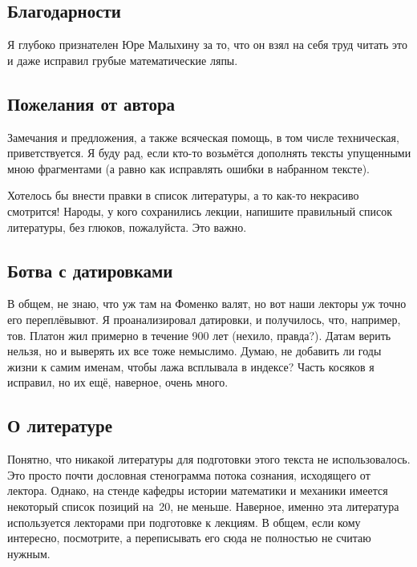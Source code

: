 \documentclass[a4paper,oneside,fleqn,10pt]{article}
\begin{document}
\subsection*{Благодарности}

Я глубоко признателен Юре Малыхину за то, что он взял на себя труд читать это
и даже исправил грубые математические ляпы.

\subsection*{Пожелания от автора}

Замечания и предложения, а также всяческая помощь, в том числе техническая, приветствуется.
Я буду рад, если кто-то возьмётся дополнять тексты упущенными
мною фрагментами (а равно как исправлять ошибки в набранном тексте).

Хотелось бы внести правки в список литературы, а то как-то некрасиво смотрится!
Народы, у кого сохранились лекции, напишите правильный список литературы,
без глюков, пожалуйста. Это важно.

\subsection*{Ботва с датировками}

В общем, не знаю, что уж там на Фоменко валят,
но вот наши лекторы уж точно его переплёвывют.
Я проанализировал датировки, и получилось, что,
например, тов. Платон жил примерно в течение 900 лет (нехило, правда?).
Датам верить нельзя, но и выверять их все тоже немыслимо. Думаю, не добавить ли годы жизни к
самим именам, чтобы лажа всплывала в индексе?
Часть косяков я исправил, но их ещё, наверное, очень много.

\subsection*{О литературе}

Понятно, что никакой литературы для подготовки этого текста не использовалось.
Это просто почти дословная стенограмма потока сознания, исходящего от лектора.
Однако, на стенде кафедры истории математики и механики имеется некоторый список
позиций на~20, не меньше. Наверное, именно эта литература используется лекторами
при подготовке к лекциям. В общем, если кому интересно, посмотрите, а переписывать
его сюда не полностью не считаю нужным.

\medskip
\dmvntrail
\end{document}
